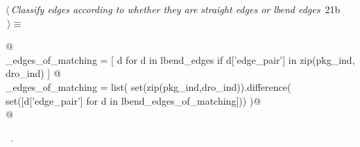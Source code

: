 \documentclass[10pt, english, oneside]{report}
\begin{document}
\begin{flushleft} \small
\begin{minipage}{\linewidth}\label{scrap22}\raggedright\small
{} $\langle\,${\itshape Classify edges according to whether they are straight edges or lbend edges}\nobreak\ {\footnotesize {21b}}$\,\rangle\equiv$
\vspace{-1ex}
\begin{list}{}{} \item
\mbox{}\verb@ @\\
\mbox{}\verb@lbend_edges_of_matching    = [ d for d in lbend_edges if d['edge_pair'] in zip(pkg_ind, dro_ind) ] @\\
\mbox{}\verb@straight_edges_of_matching = list(  set(zip(pkg_ind,dro_ind)).difference(\@\\
\mbox{}\verb@                                                set([d['edge_pair'] for d in lbend_edges_of_matching]))   )@\\
\mbox{}\verb@ @\\
\mbox{}\verb@@{\NWsep}
\end{list}
\vspace{-1.5ex}
\footnotesize
\begin{list}{}{\setlength{\itemsep}{-\parsep}\setlength{\itemindent}{-\leftmargin}}
\item \NWtxtMacroRefIn\ .

\item{}
\end{list}
\end{minipage}\vspace{4ex}
\end{flushleft}
\end{document}

